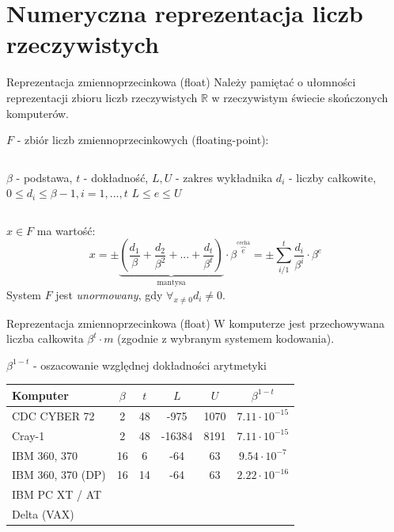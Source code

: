 \section{Numeryczna reprezentacja liczb rzeczywistych}
\begin{frame}{Reprezentacja zmiennoprzecinkowa (float)}
    Należy pamiętać o ułomności reprezentacji zbioru liczb rzeczywistych $\mathbb{R}$ w rzeczywistym świecie skończonych komputerów.
    \begin{block}{}
    $F$ - zbiór liczb zmiennoprzecinkowych (floating-point):\newline
    \begin{columns}
            $\beta$ - podstawa,\newline
            $t$ - dokładność,\newline
            $L, U$ - zakres wykładnika\newline
            $d_i$ - liczby całkowite,
            $0 \le d_i \le \beta - 1, i=1,...,t$
            $L \le e \le U$
    \end{columns}
    $x \in F$ ma wartość:
    \[
    x = \pm \underbrace{\left(\frac{d_1}{\beta} + \frac{d_2}{\beta^2} + ... + \frac{d_t}{\beta^t}\right)}_\text{mantysa} \cdot \beta^{\overbrace{e}^\text{cecha}}
    = \pm \sum_{i/1}^{t} \frac{d_i}{\beta^i} \cdot \beta^e
    \]        
    System $F$ jest {\it unormowany}, gdy $\forall_{x \ne 0} d_i \ne 0$.
    \end{block}

\end{frame}
\begin{frame}{Reprezentacja zmiennoprzecinkowa (float)}
    W komputerze jest przechowywana liczba całkowita $\beta^t \cdot m$ (zgodnie z wybranym systemem kodowania).

    $\beta^{1-t}$ - oszacowanie względnej dokładności arytmetyki

    \hspace{0.5cm}
    \centering
    \begin{tabular}{| l | c | c | c | c | c |}
    \hline
    Komputer & $\beta$ & $t$ & $L$ & $U$ & $\beta^{1-t}$ \\ \hline
    CDC CYBER 72 		& 2  & 48 & -975 	& 1070 & $7.11 \cdot 10^{-15}$ \\ \hline
    Cray-1 				& 2  & 48 & -16384	& 8191 & $7.11 \cdot 10^{-15}$ \\ \hline
    IBM 360, 370 		& 16 & 6  & -64		& 63   & $9.54 \cdot 10^{-7}$ \\ \hline
    IBM 360, 370 (DP) 	& 16 & 14 & -64 	& 63   & $2.22 \cdot 10^{-16}$ \\ \hline
    IBM PC XT / AT 		& & & & & \\ \hline
    Delta (VAX) 		& & & & & \\ \hline
    \end{tabular}
\end{frame}
